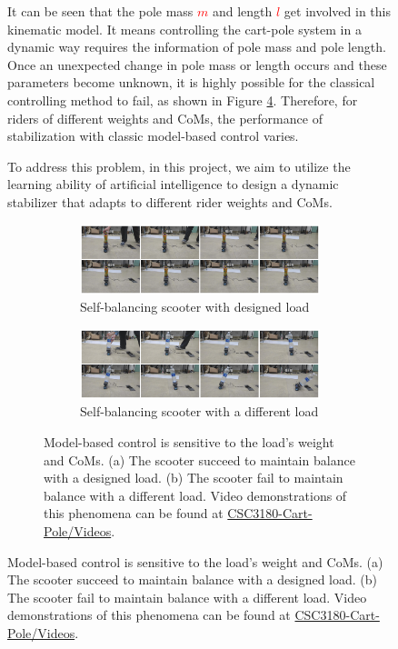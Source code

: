 \documentclass[10pt,a4paper]{article}
\begin{document}
\begin{figure}[H]
	It can be seen that the pole mass \textcolor{red}{$m$} and length \textcolor{red}{$l$} get involved in this kinematic model. It means controlling the cart-pole system in a dynamic way requires the information of pole mass and pole length. Once an unexpected change in pole mass or length occurs and these parameters become unknown, it is highly possible for the classical controlling method to fail, as shown in Figure \ref{fig:different_rider}.
	Therefore, for riders of different weights and CoMs, the performance of stabilization with classic model-based control varies. 
	
	To address this problem, in this project, we aim to utilize the learning ability of artificial intelligence to design a dynamic stabilizer that adapts to different rider weights and CoMs.
	
	
	\begin{figure}
		\centering
		\begin{subfigure}[b]{1\textwidth}
			\centering
			\includegraphics[width=1\linewidth]{figure/success}
			\caption{Self-balancing scooter with designed load}
			\label{fig:success}
		\end{subfigure}
		\hfill
		\begin{subfigure}[b]{1\textwidth}
			\centering
			\includegraphics[width=1\linewidth]{figure/fail}
			\caption{Self-balancing scooter with a different load}
			\label{fig:fail}
		\end{subfigure}
		\caption{Model-based control is sensitive to the load's weight and CoMs. (a) The scooter succeed to maintain balance with a designed load. (b) The scooter fail to maintain balance with a different load. Video demonstrations of this phenomena can be found at \href{https://1drv.ms/f/s!AmutmbT5H6Pkm0sNJx83Q54XewmB?e=HUkzYK}{CSC3180-Cart-Pole/Videos}.}
		\label{fig:different_rider}
	\end{figure}
	

\end{figure}
\end{document}
